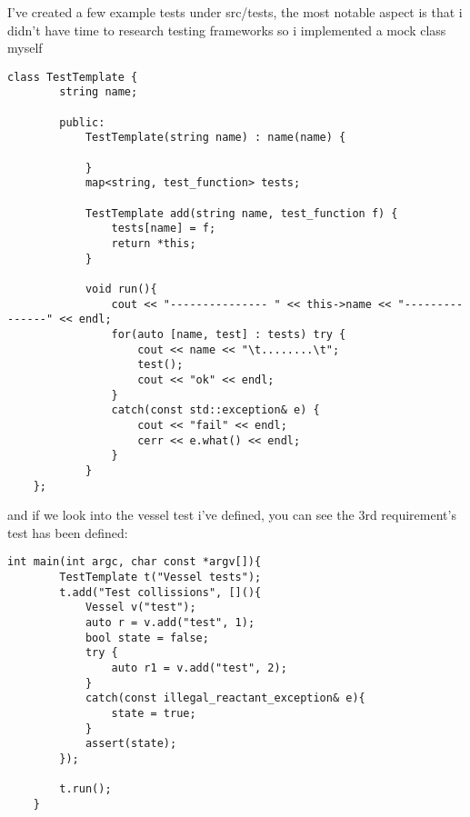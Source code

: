 
I've created a few example tests under src/tests, the most notable aspect is that i didn't have time to research testing frameworks so i implemented a mock class myself

\begin{lstlisting}[style=colorC++]
    class TestTemplate {
        string name;
    
        public:
            TestTemplate(string name) : name(name) {
    
            }
            map<string, test_function> tests;
    
            TestTemplate add(string name, test_function f) {
                tests[name] = f;
                return *this;
            }
    
            void run(){
                cout << "--------------- " << this->name << "---------------" << endl;
                for(auto [name, test] : tests) try {
                    cout << name << "\t........\t";
                    test();
                    cout << "ok" << endl;
                }
                catch(const std::exception& e) {
                    cout << "fail" << endl;
                    cerr << e.what() << endl;
                }
            }
    };
\end{lstlisting}

and if we look into the vessel test i've defined, you can see the 3rd requirement's test has been defined:

\begin{lstlisting}[style=colorC++]
    int main(int argc, char const *argv[]){
        TestTemplate t("Vessel tests");
        t.add("Test collissions", [](){
            Vessel v("test");
            auto r = v.add("test", 1);
            bool state = false;
            try {
                auto r1 = v.add("test", 2);
            }
            catch(const illegal_reactant_exception& e){
                state = true;
            }
            assert(state);
        });

        t.run();
    }
\end{lstlisting}


